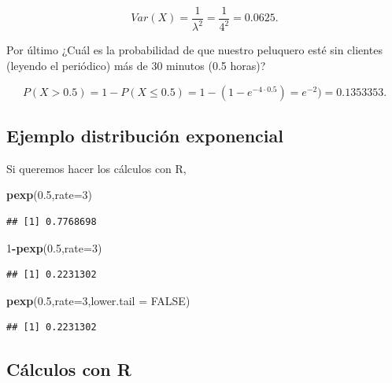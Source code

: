 \documentclass[]{book}
\newenvironment{Shaded}{\begin{snugshade}}{\end{snugshade}}
\newcommand{\DataTypeTok}[1]{\textcolor[rgb]{0.13,0.29,0.53}{#1}}
\newcommand{\DecValTok}[1]{\textcolor[rgb]{0.00,0.00,0.81}{#1}}
\newcommand{\FloatTok}[1]{\textcolor[rgb]{0.00,0.00,0.81}{#1}}
\newcommand{\KeywordTok}[1]{\textcolor[rgb]{0.13,0.29,0.53}{\textbf{#1}}}
\newcommand{\NormalTok}[1]{#1}
\newcommand{\OperatorTok}[1]{\textcolor[rgb]{0.81,0.36,0.00}{\textbf{#1}}}
\newcommand{\OtherTok}[1]{\textcolor[rgb]{0.56,0.35,0.01}{#1}}
\begin{document}
\[
Var(X)=\frac{1}{\lambda^2}=\frac{1}{4^2}=0.0625.
\]

Por último ¿Cuál es la probabilidad de que nuestro peluquero esté sin clientes (leyendo el periódico) más de 30 minutos (0.5 horas)?

\[
P(X>0.5)=1-P(X\leq 0.5)=1-(1-e^{-4\cdot 0.5 })=e^{-2})=0.1353353.
\]

\hypertarget{ejemplo-distribuciuxf3n-exponencial-2}{%
\subsection{Ejemplo distribución exponencial}\label{ejemplo-distribuciuxf3n-exponencial-2}}

Si queremos hacer los cálculos con R,

\begin{Shaded}
\begin{Highlighting}[]
\KeywordTok{pexp}\NormalTok{(}\FloatTok{0.5}\NormalTok{,}\DataTypeTok{rate=}\DecValTok{3}\NormalTok{)}
\end{Highlighting}
\end{Shaded}

\begin{verbatim}
## [1] 0.7768698
\end{verbatim}

\begin{Shaded}
\begin{Highlighting}[]
\DecValTok{1}\OperatorTok{-}\KeywordTok{pexp}\NormalTok{(}\FloatTok{0.5}\NormalTok{,}\DataTypeTok{rate=}\DecValTok{3}\NormalTok{)}
\end{Highlighting}
\end{Shaded}

\begin{verbatim}
## [1] 0.2231302
\end{verbatim}

\begin{Shaded}
\begin{Highlighting}[]
\KeywordTok{pexp}\NormalTok{(}\FloatTok{0.5}\NormalTok{,}\DataTypeTok{rate=}\DecValTok{3}\NormalTok{,}\DataTypeTok{lower.tail =} \OtherTok{FALSE}\NormalTok{)}
\end{Highlighting}
\end{Shaded}

\begin{verbatim}
## [1] 0.2231302
\end{verbatim}

\hypertarget{cuxe1lculos-con-r-15}{%
\subsection{Cálculos con R}\label{cuxe1lculos-con-r-15}}
\end{document}
